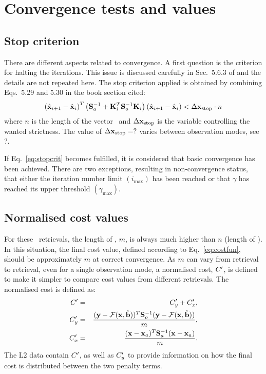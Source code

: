 \section{Convergence tests and values}
\label{sec:conv}
%
\subsection{Stop criterion}
There are different aspects related to convergence. A first question is the
criterion for halting the iterations. This issue is discussed carefully in
Sec.~5.6.3 of \citet{rodgers:00} and the details are not repeated here. The
stop criterion applied is obtained by combining Eqs.~5.29 and 5.30 in the
book section cited:
\begin{equation}
  \label{eq:stopcrit}
  \left( \hat{\mathbf{x}}_{i+1} - \hat{\mathbf{x}}_i \right)^T
  \left( \mathbf{S}_{a}^{-1} + 
         \mathbf{K}_{i}^T\mathbf{S}_{o}^{-1}\mathbf{K}_{i} \right)
  \left( \hat{\mathbf{x}}_{i+1} - \hat{\mathbf{x}}_i \right) < \Delta\mathbf{x}_\mathrm{stop} \cdot n
\end{equation}
where $n$ is the length of the vector \SttVct\ and
$\Delta\mathbf{x}_\mathrm{stop}$ is the variable controlling the wanted
strictness. The value of $\Delta\mathbf{x}_\mathrm{stop}=?$ varies between
observation modes, see ?.

If Eq.~\ref{eq:stopcrit} becomes fulfilled, it is considered that basic
convergence has been achieved. There are two exceptions, resulting in
non-convergence status, that either the iteration number limit
$(i_\mathrm{max})$ has been reached or that $\gamma$ has reached its upper
threshold $(\gamma_\mathrm{max})$.


\subsection{Normalised cost values}
%
For these \smr\ retrievals, the length of \MsrVct, $m$, is always much higher
than $n$ (length of \SttVct). In this situation, the final cost value, defined
according to Eq.~\ref{eq:costfun}, should be approximately $m$ at correct
convergence. As $m$ can vary from retrieval to retrieval, even for a single
observation mode, a normalised cost, $C'$, is defined to make it simpler to
compare cost values from different retrievals. The normalised cost is
defined as:
\begin{eqnarray}
  \label{eq:scaledc}
  C' &=& C_y' + C_x', \\
  C_y' &=& \frac{(\mathbf{y}-\mathcal{F}(\mathbf{x},\hat{\mathbf{b}}))^T\mathbf{S}_{o}^{-1}
  (\mathbf{y}-\mathcal{F}(\mathbf{x},\hat{\mathbf{b}}))}{m},\\
  C_x' &=& \frac{(\mathbf{x}-\mathbf{x}_{a})^T\mathbf{S}_{a}^{-1}(\mathbf{x}-\mathbf{x}_{a})}{m}.\\
\end{eqnarray}
The L2 data contain $C'$, as well as $C_y'$ to provide information
on how the final cost is distributed between the two penalty terms.


